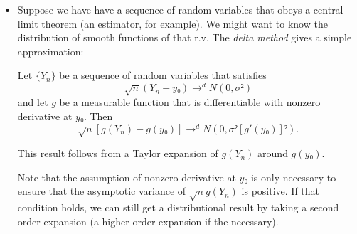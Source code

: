 \begin{itemize}
\item Suppose we have have a sequence of random variables that obeys a
  central limit theorem (an estimator, for example).  We might want to
  know the distribution of smooth functions of that r.v.  The
  \emph{delta method} gives a simple approximation:

  \begin{thm}
    Let $\{Y_n\}$ be a sequence of random variables that satisfies
    \begin{equation*}
      \sqrt{n} (Y_n - y₀) →^d N(0,σ²)
    \end{equation*}
    and let $g$ be a measurable function that is differentiable with
    nonzero derivative at $y₀$.  Then
    \begin{equation*}
      \sqrt{n}[g(Y_n) - g(y₀)] →^d N(0, σ²[g'(y₀)]²).
    \end{equation*}
  \end{thm}

  This result follows from a Taylor expansion of $g(Y_n)$ around
  $g(y₀)$.

  Note that the assumption of nonzero derivative at $y₀$ is only
  necessary to ensure that the asymptotic variance of $\sqrt{n}
  g(Y_n)$ is positive.  If that condition holds, we can still get a
  distributional result by taking a second order expansion (a
  higher-order expansion if the necessary).
\end{itemize}

